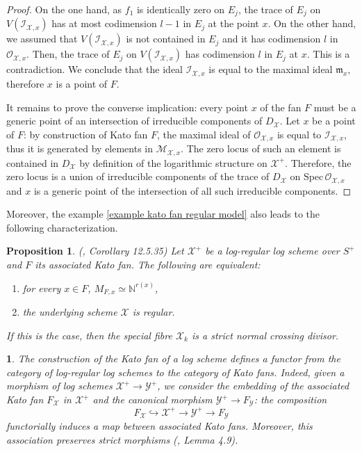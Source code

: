 \documentclass{amsart}%
\numberwithin{equation}{subsection}
\theoremstyle{plain2}
\newtheorem{prop}[equation]{Proposition}
\theoremstyle{definition2}
\theoremstyle{stepstyle}
\theoremstyle{point}
\theoremstyle{subpoint}
\newtheorem{subpoint}[equation]{}%
\newcommand{\spa}[1]{\begin{subpoint}#1\end{subpoint}}           %
\newcommand{\N}{\ensuremath{\mathbb{N}}}
\newcommand{\cX}{\ensuremath{\mathscr{X}}}
\newcommand{\caO}{\ensuremath{\mathcal{O}}}
\newcommand{\caI}{\ensuremath{\mathcal{I}}}
\newcommand{\cY}{\ensuremath{\mathscr{Y}}}
\renewcommand{\cY}{\ensuremath{\mathscr{Y}}}
\newcommand{\Spec}{\ensuremath{\mathrm{Spec}\,}}
\begin{document}
\begin{proof}
On the one hand, as $f_1$ is identically zero on $E_j$, the trace of $E_j$ on $V(\caI_{\cX,x})$ has at most codimension $l-1$ in $E_j$ at the point $x$. On the other hand, we assumed that $V(\caI_{\cX,x})$ is not contained in $E_j$ and it has codimension $l$ in $\caO_{\cX,x}$. Then, the trace of $E_j$ on $V(\caI_{\cX,x})$ has codimension $l$ in $E_j$ at $x$. This is a contradiction. We conclude that the ideal $\caI_{\cX,x}$ is equal to the maximal ideal $\mathfrak{m}_x$, therefore $x$ is a point of $F$.

It remains to prove the converse implication: every point $x$ of the fan $F$ must be a generic point of an intersection of irreducible components of $D_{\cX}$. Let $x$ be a point of $F$: by construction of Kato fan $F$, the maximal ideal of $\mathcal{O}_{\cX,x}$ is equal to $\mathcal{I}_{\cX,x}$, thus it is generated by elements in $\mathcal{M}_{\cX,x}$. The zero locus of such an element is contained in $D_{\cX}$ by definition of the logarithmic structure on $\cX^+$. Therefore, the zero locus is a union of irreducible components of the trace of $D_{\cX}$ on $\Spec \mathcal{O}_{\cX,x}$ and $x$ is a generic point of the intersection of all such irreducible components.
\end{proof}

Moreover, the example \ref{example kato fan regular model} also leads to the following characterization.

\begin{prop} \label{resolution log scheme kato fan} (\cite{GabberRamero}, Corollary 12.5.35)
Let $\cX^+$ be a log-regular log scheme over $S^+$ and $F$ its associated Kato fan. The following are equivalent: \begin{enumerate}
\item for every $x \in F$, $M_{F,x} \simeq \N^{r(x)}$,
\item the underlying scheme $\cX$ is regular.
\end{enumerate}
If this is the case, then the special fibre $\cX_k$ is a strict normal crossing divisor.
\end{prop}
\spa{The construction of the Kato fan of a log scheme defines a functor from the category of log-regular log schemes to the category of Kato fans. Indeed, given a morphism of log schemes $\cX^+ \rightarrow \cY^+$, we consider the embedding of the associated Kato fan $F_{\cX}$ in $\cX^+$ and the canonical morphism $\cY^+ \rightarrow F_{\cY}$: the composition $$F_{\cX} \hookrightarrow \cX^+ \rightarrow \cY^+ \rightarrow F_\cY$$ functorially induces a map between associated Kato fans. Moreover, this association preserves strict morphisms (\cite{Ulirsch2013}, Lemma 4.9).}
\end{document}
